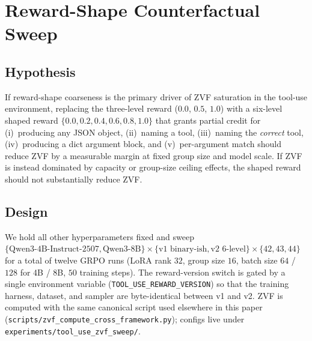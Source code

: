 
\section{Reward-Shape Counterfactual Sweep}
\label{app:zvf-counterfactual}

\subsection{Hypothesis}
If reward-shape coarseness is the primary driver of ZVF saturation in the
tool-use environment, replacing the three-level reward (\(0.0\), \(0.5\), \(1.0\))
with a six-level shaped reward
\(\{0.0, 0.2, 0.4, 0.6, 0.8, 1.0\}\)
that grants partial credit for (i)~producing any JSON object, (ii)~naming a
tool, (iii)~naming the \emph{correct} tool, (iv)~producing a dict argument
block, and (v)~per-argument match should reduce ZVF by a measurable margin at
fixed group size and model scale. If ZVF is instead dominated by capacity or
group-size ceiling effects, the shaped reward should not substantially reduce
ZVF.

\subsection{Design}
We hold all other hyperparameters fixed and sweep
\(\{\text{Qwen3-4B-Instruct-2507}, \text{Qwen3-8B}\}
 \times \{\text{v1 binary-ish}, \text{v2 6-level}\}
 \times \{42, 43, 44\}\)
for a total of twelve GRPO runs
(LoRA rank \(32\), group size \(16\), batch size
\(64\) / \(128\) for 4B / 8B, \(50\) training steps).
The reward-version switch is gated by a single environment variable
(\texttt{TOOL\_USE\_REWARD\_VERSION}) so that the training harness, dataset,
and sampler are byte-identical between v1 and v2. ZVF is computed with the
same canonical script used elsewhere in this paper
(\texttt{scripts/zvf\_compute\_cross\_framework.py}); configs live under
\texttt{experiments/tool\_use\_zvf\_sweep/}.

